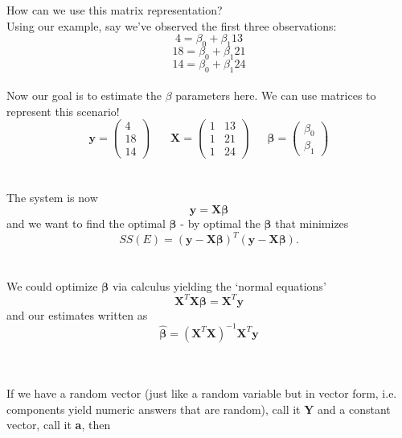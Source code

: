 \Large How can we use this matrix representation?\large\\
Using our example, say we've observed the first three observations:
$$4=\beta_0+\beta_{1}13$$
$$18=\beta_0+\beta_{1}21$$
$$14=\beta_0+\beta_{1}24$$~\\
Now our goal is to estimate the $\beta$ parameters here.  We can use matrices to represent this scenario!
$$\textbf{y}=\left(\begin{array}{c}4 \\ 18\\ 14\end{array}\right)~~~~~~~~\textbf{X}=\left(\begin{array}{cc} 1 & 13\\ 1 & 21 \\ 1 & 24\end{array}\right)~~~~~~~\boldsymbol{\beta}=\left(\begin{array}{c}\beta_0\\\beta_1\end{array}\right)$$
~\\~\\
The system is now
$$\textbf{y}=\textbf{X}\boldsymbol{\beta}$$
and we want to find the optimal $\boldsymbol{\beta}$ - by optimal the $\boldsymbol{\beta}$ that minimizes 
$$SS(E) = (\textbf{y}-\textbf{X}\boldsymbol{\beta})^T(\textbf{y}-\textbf{X}\boldsymbol{\beta}).$$~\\~\\
We could optimize $\boldsymbol{\beta}$ via calculus yielding the `normal equations'
$$\textbf{X}^{T}\textbf{X}\boldsymbol{\beta}=\textbf{X}^{T}\textbf{y}$$
and our estimates written as 
$$\boldsymbol{\hat{\beta}}=\left(\textbf{X}^{T}\textbf{X}\right)^{-1}\textbf{X}^{T}\textbf{y}$$~\\~\\

\newpage

If we have a random vector (just like a random variable but in vector form, i.e. components yield numeric answers that are random), call it $\textbf{Y}$ and a constant vector, call it \textbf{a}, then\\~\\~\\~\\~\\~\\~\\~\\~\\~\\~\\

